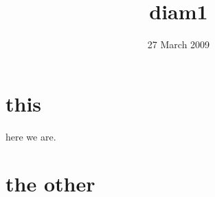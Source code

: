 \documentclass[pre,preprint]{revtex4}
\title{diam1}
\date{27 March 2009}
\begin{document}


\maketitle

\section{this}

here we are.



\section{the other}
\end{document}
